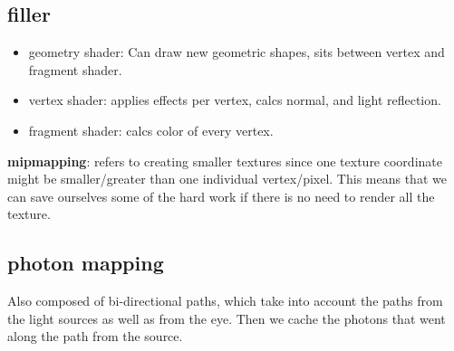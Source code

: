 \documentclass[landscape,4pt,a4paper]{article}
\begin{document}
\begin{multicols*}{5}
	\section{filler}
		\begin{itemize}
				\item{geometry shader}: Can draw new geometric shapes, sits between vertex and fragment shader.
				\item{vertex shader}: applies effects per vertex, calcs normal, and light reflection.
				\item{fragment shader}: calcs color of every vertex.
		\end{itemize}
		\textbf{mipmapping}: refers to creating smaller textures since one texture coordinate might be smaller/greater
			than one individual vertex/pixel. This means that we can save ourselves some of the hard work if there is 
			no need to render all the texture.
		\subsection{photon mapping}
			Also composed of bi-directional paths, which take into account the paths from the light sources as well as 
			from the eye. Then we cache the photons that went along the path from the source. 
\end{multicols*}
\end{document}
